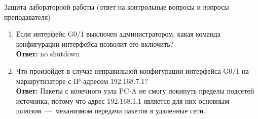 \documentclass[a4paper,14pt]{extarticle}
\begin{document}
\begin{mypart}{Защита лабораторной работы (ответ на контрольные
	вопросы и вопросы преподавателя)}


\begin{enumerate}
	\item Если интерфейс G0/1 выключен администратором, какая команда конфигурации интерфейса позволит
	его включить?
		\\\textbf{Ответ:} no shutdown
	\item Что произойдет в случае неправильной конфигурации интерфейса G0/1 на маршрутизаторе с IP-адресом 192.168.7.1?
		\\\textbf{Ответ:} Пакеты с конечного узла PC-A не смогу покинуть пределы подсетей источника, потому что адрес 192.168.1.1 является для них основным шлюзом~---~механизмом передачи пакетов в удаленные сети.
\end{enumerate}

\end{mypart}
\end{document}
